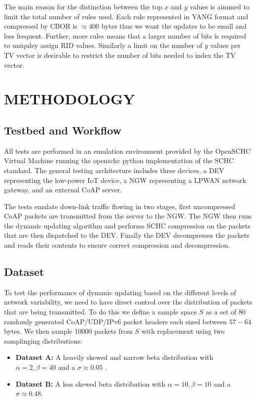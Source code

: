 \documentclass[12pt]{dalthesis}
\begin{document}
	\par{
		The main reason for the distinction between the top $x$ and $y$ values is aimmed to limit the total number of rules used. Each 
		rule represented in YANG format and compressed by CBOR is $\approx 400$ bytes thus we want the updates to be small and less frequent. Further, more
		rules means that a larger number of bits is required to uniquley assign RID values. Similarly a limit on the number of
		$y$ values per TV vector is desirable to restrict the number of bits needed to index the TV vector.
	}

	\par{
		
	}
	\chapter{METHODOLOGY}
	\section{Testbed and Workflow}
	All tests are performed in an emulation environment provided by the OpenSCHC Virtual Machine running
	the openschc python implementation of the SCHC standard. The general testing architecture includes three devices, a DEV representing
	the low-power IoT device, a NGW representing a LPWAN network gateway, and an external CoAP server. 	
	
	The tests emulate down-link traffic flowing in two stages,
	first uncompressed CoAP packets are transmitted from the server to the NGW. The NGW then
	runs the dynamic updating algorithm and performs SCHC compression on the packets that are then dispatched to the DEV.  
	Finally the DEV decompresses the packets and reads their contents to ensure correct compression and decompression. 

	\section{Dataset}
	To test the performance of dynamic updating based on the different levels of network variability, we need to have direct control
	over the distribution of packets that are being transmitted. To do this we define a sample space $S$ as a set of 80 randomly generated CoAP/UDP/IPv6 
	packet headers each sized between $57-64$ bytes. 
	We then sample 10000 packets from $S$ with replacement using two samplinging distributions: 
	\begin{itemize}
		\item \textbf{Dataset A:} A heavily skewed and narrow beta distribution with $\alpha = 2, \beta = 40$ and a $\sigma \approx 0.05$ .
		\item \textbf{Dataset B:} A less skewed beta distribution  with $\alpha = 10, \beta = 10$ and a $\sigma \approx 0.48$. 
	\end{itemize}
\end{document}
